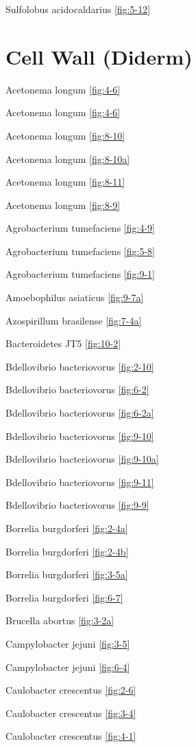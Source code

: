 \documentclass[]{tufte-book}
\begin{document}
Sulfolobus acidocaldarius \ref{fig:5-12}

\section*{Cell Wall (Diderm)}\label{cell-wall-diderm}

Acetonema longum \ref{fig:4-6}

Acetonema longum \ref{fig:4-6}

Acetonema longum \ref{fig:8-10}

Acetonema longum \ref{fig:8-10a}

Acetonema longum \ref{fig:8-11}

Acetonema longum \ref{fig:8-9}

Agrobacterium tumefaciens \ref{fig:4-9}

Agrobacterium tumefaciens \ref{fig:5-8}

Agrobacterium tumefaciens \ref{fig:9-1}

Amoebophilus asiaticus \ref{fig:9-7a}

Azospirillum brasilense \ref{fig:7-4a}

Bacteroidetes JT5 \ref{fig:10-2}

Bdellovibrio bacteriovorus \ref{fig:2-10}

Bdellovibrio bacteriovorus \ref{fig:6-2}

Bdellovibrio bacteriovorus \ref{fig:6-2a}

Bdellovibrio bacteriovorus \ref{fig:9-10}

Bdellovibrio bacteriovorus \ref{fig:9-10a}

Bdellovibrio bacteriovorus \ref{fig:9-11}

Bdellovibrio bacteriovorus \ref{fig:9-9}

Borrelia burgdorferi \ref{fig:2-4a}

Borrelia burgdorferi \ref{fig:2-4b}

Borrelia burgdorferi \ref{fig:3-5a}

Borrelia burgdorferi \ref{fig:6-7}

Brucella abortus \ref{fig:3-2a}

Campylobacter jejuni \ref{fig:3-5}

Campylobacter jejuni \ref{fig:6-4}

Caulobacter crescentus \ref{fig:2-6}

Caulobacter crescentus \ref{fig:3-4}

Caulobacter crescentus \ref{fig:4-1}
\end{document}
